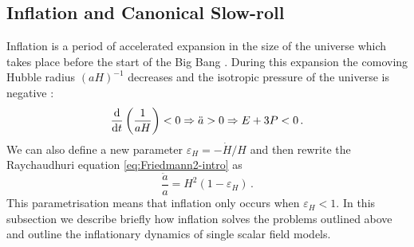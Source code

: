 \subsection{Inflation and Canonical Slow-roll}
\label{sec:slowroll-intro}

Inflation is a period of accelerated expansion in the size of the universe
which takes place before the start of the Big Bang
\cite{Starobinsky:1980te,Guth:1980zm,Albrecht:1982wi,Linde:1981mu,
Starobinsky:1982ee}. During this
expansion the comoving Hubble radius $(aH)^{-1}$ decreases and the isotropic
pressure of the universe is negative \cite{book:liddle, Baumann2009}:
\begin{equation}
\label{eq:infldefn-intro}
 \frac{\mathrm{d} }{\mathrm{d} t}\left( \frac{1}{aH}\right) <0 \Rightarrow \ddot{a}>0
  \Rightarrow E + 3P < 0 \,.
\end{equation}
We can also define a new parameter $\varepsilon_H = -\dot{H}/H$ and then rewrite
the Raychaudhuri equation \eqref{eq:Friedmann2-intro} as
% 
\begin{equation}
 \label{eq:Friedeps-intro}
 \frac{\ddot{a}}{a} = H^2 (1-\varepsilon_H)\,.
\end{equation}
% 
This parametrisation means that inflation only occurs when $\varepsilon_H<1$.
In this subsection we describe briefly how inflation solves the problems
outlined above and outline the inflationary dynamics of single scalar field
models. 


